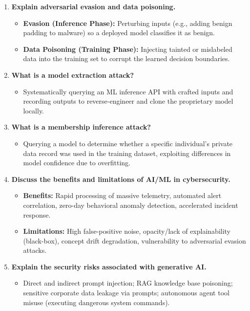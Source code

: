 \begin{enumerate}[label=\textbf{Q\arabic*.,resume},leftmargin=1.2cm]
\item \textbf{Explain adversarial evasion and data poisoning.}
\begin{itemize}
\item \textbf{Evasion (Inference Phase):} Perturbing inputs (e.g., adding benign padding to malware) so a deployed model classifies it as benign.
\item \textbf{Data Poisoning (Training Phase):} Injecting tainted or mislabeled data into the training set to corrupt the learned decision boundaries.
\end{itemize}

\item \textbf{What is a model extraction attack?}
\begin{itemize}
\item Systematically querying an ML inference API with crafted inputs and recording outputs to reverse-engineer and clone the proprietary model locally.
\end{itemize}

\item \textbf{What is a membership inference attack?}
\begin{itemize}
\item Querying a model to determine whether a specific individual's private data record was used in the training dataset, exploiting differences in model confidence due to overfitting.
\end{itemize}

\item \textbf{Discuss the benefits and limitations of AI/ML in cybersecurity.}
\begin{itemize}
\item \textbf{Benefits:} Rapid processing of massive telemetry, automated alert correlation, zero-day behavioral anomaly detection, accelerated incident response.
\item \textbf{Limitations:} High false-positive noise, opacity/lack of explainability (black-box), concept drift degradation, vulnerability to adversarial evasion attacks.
\end{itemize}

\item \textbf{Explain the security risks associated with generative AI.}
\begin{itemize}
\item Direct and indirect prompt injection; RAG knowledge base poisoning; sensitive corporate data leakage via prompts; autonomous agent tool misuse (executing dangerous system commands).
\end{itemize}


\end{enumerate}
